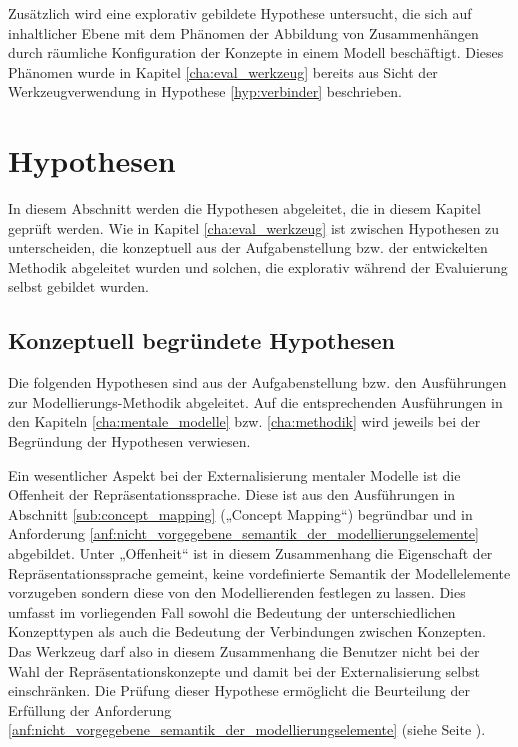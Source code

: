 Zusätzlich wird eine explorativ gebildete Hypothese untersucht, die sich auf inhaltlicher Ebene mit dem Phänomen der Abbildung von Zusammenhängen durch räumliche Konfiguration der Konzepte in einem Modell beschäftigt. Dieses Phänomen wurde in Kapitel \ref{cha:eval_werkzeug} bereits aus Sicht der Werkzeugverwendung in Hypothese \ref{hyp:verbinder} beschrieben.

\section{Hypothesen} %
\label{sec:m_hypothesen}

In diesem Abschnitt werden die Hypothesen abgeleitet, die in diesem Kapitel geprüft werden. Wie in Kapitel \ref{cha:eval_werkzeug} ist zwischen Hypothesen zu unterscheiden, die konzeptuell aus der Aufgabenstellung bzw. der entwickelten Methodik abgeleitet wurden und solchen, die explorativ während der Evaluierung selbst gebildet wurden.

\subsection{Konzeptuell begründete Hypothesen} %
\label{sub:m_konzeptuell_begründete_hypothesen}

Die folgenden Hypothesen sind aus der Aufgabenstellung bzw. den Ausführungen zur Modellierungs-Methodik abgeleitet. Auf die entsprechenden Ausführungen in den Kapiteln \ref{cha:mentale_modelle} bzw. \ref{cha:methodik} wird jeweils bei der Begründung der Hypothesen verwiesen.

Ein wesentlicher Aspekt bei der Externalisierung mentaler Modelle ist die Offenheit der Repräsentationssprache. Diese ist aus den Ausführungen in Abschnitt \ref{sub:concept_mapping} („Concept Mapping“) begründbar und in Anforderung \ref{anf:nicht_vorgegebene_semantik_der_modellierungselemente} abgebildet. Unter „Offenheit“ ist in diesem Zusammenhang die Eigenschaft der Repräsentationssprache gemeint, keine vordefinierte Semantik der Modellelemente vorzugeben sondern diese von den Modellierenden festlegen zu lassen. Dies umfasst im vorliegenden Fall sowohl die Bedeutung der unterschiedlichen Konzepttypen als auch die Bedeutung der Verbindungen zwischen Konzepten. Das Werkzeug darf also in diesem Zusammenhang die Benutzer nicht bei der Wahl der Repräsentationskonzepte und damit bei der Externalisierung selbst einschränken. Die Prüfung dieser Hypothese ermöglicht die Beurteilung der Erfüllung der Anforderung \ref{anf:nicht_vorgegebene_semantik_der_modellierungselemente} (siehe Seite \pageref{anf:nicht_vorgegebene_semantik_der_modellierungselemente}).

